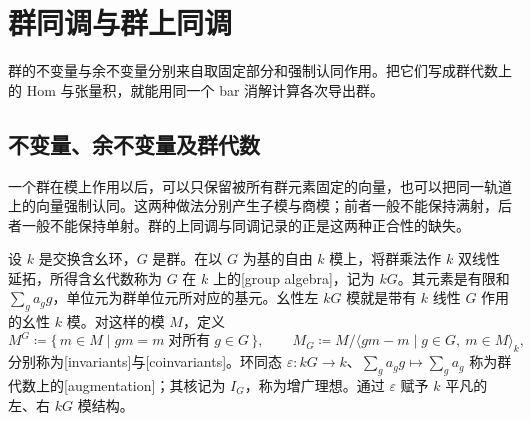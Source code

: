 
\section{群同调与群上同调}
\label{b4:sec:1101}

群的不变量与余不变量分别来自取固定部分和强制认同作用。把它们写成群代数上的 Hom 与张量积，就能用同一个 bar 消解计算各次导出群。

%
%

\subsection{不变量、余不变量及群代数}
\label{b4:subsec:1101:01}

一个群在模上作用以后，可以只保留被所有群元素固定的向量，也可以把同一轨道上的向量强制认同。这两种做法分别产生子模与商模；前者一般不能保持满射，后者一般不能保持单射。群的上同调与同调记录的正是这两种正合性的缺失。

\begin{definition}\label{b4:def:group-invariants}
	设 \(k\) 是交换含幺环，\(G\) 是群。在以 \(G\) 为基的自由 \(k\) 模上，将群乘法作 \(k\) 双线性延拓，所得含幺代数称为 \(G\) 在 \(k\) 上的[group algebra]，记为 \(kG\)。其元素是有限和 \(\sum_g a_g g\)，单位元为群单位元所对应的基元。幺性左 \(kG\) 模就是带有 \(k\) 线性 \(G\) 作用的幺性 \(k\) 模。对这样的模 \(M\)，定义
	\[
		M^G\coloneqq\{\,m\in M\mid gm=m\;\text{对所有}\;g\in G\,\}, \qquad M_G\coloneqq M/\langle gm-m\mid g\in G,\ m\in M\rangle_k,
	\]
	分别称为[invariants]与[coinvariants]。环同态 \(\varepsilon:kG\to k\)、\(\sum_g a_g g\mapsto\sum_g a_g\) 称为群代数上的[augmentation]；其核记为 \(I_G\)，称为增广理想。通过 \(\varepsilon\) 赋予 \(k\) 平凡的左、右 \(kG\) 模结构。
\end{definition}

